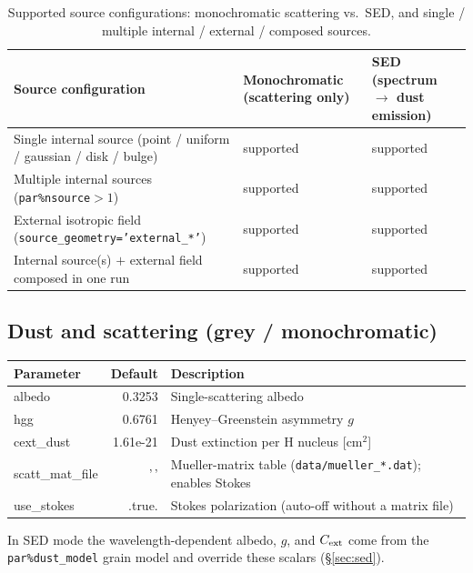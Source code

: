 \documentclass[english,a4paper]{kiseon_memo}
\newcommand{\pp}[1]{\texttt{par\%#1}}
\newcommand{\code}[1]{\texttt{#1}}
\newcommand{\file}[1]{\texttt{#1}}
\begin{document}
\begin{table}[htb]
\centering
\caption{Supported source configurations: monochromatic scattering vs.\ SED, and
single / multiple internal / external / composed sources.}
\label{tab:srcconfig}
\small
\begin{tabular}{>{\raggedright\arraybackslash}p{}
                >{\centering\arraybackslash}p{}
                >{\centering\arraybackslash}p{}}
\toprule
Source configuration & Monochromatic (scattering only) & SED (spectrum $\to$ dust emission)\\
\midrule
Single internal source (point / uniform / gaussian / disk / bulge) & supported & supported\\
Multiple internal sources (\pp{nsource}${}>1$) & supported & supported\\
External isotropic field (\code{source\_geometry='external\_*'}) & supported & supported\\
Internal source(s) $+$ external field composed in one run & supported & supported\\
\bottomrule
\end{tabular}
\end{table}

\subsection{Dust and scattering (grey / monochromatic)}
\begin{longtable}{P D X}
\toprule
\textrm{Parameter} & \textrm{Default} & \textrm{Description}\\
\midrule \endhead
albedo             & 0.3253 & Single-scattering albedo\\
hgg                & 0.6761 & Henyey--Greenstein asymmetry $g$\\
cext\_dust         & 1.61e-21 & Dust extinction per H nucleus [cm$^2$]\\
scatt\_mat\_file   & '\,'   & Mueller-matrix table (\file{data/mueller\_*.dat}); enables Stokes\\
use\_stokes        & .true. & Stokes polarization (auto-off without a matrix file)\\
\bottomrule
\end{longtable}
In SED mode the wavelength-dependent albedo, $g$, and $C_{\rm ext}$ come from
the \pp{dust\_model} grain model and override these scalars (\S\ref{sec:sed}).
\end{document}

